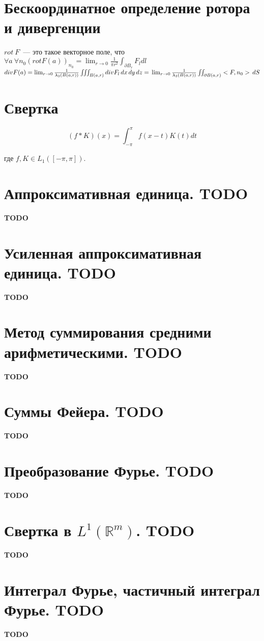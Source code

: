 \documentclass[paper=a4, fontsize=17pt]{article}
\begin{document}
	\section{Бескоординатное определение ротора и дивергенции}
	$rot\ F$~--- это такое векторное поле, что $\forall a \ \forall n_0 (rot F(a))_{n_0} = \lim_{r\to 0} \frac{1}{\pi r^2} \int_{\partial B_r} F_ldl$
\\

	$div F(a) = \lim_{r\to 0} \frac{1}{\lambda_3(B(a,r))} \iiint_{B(a,r)} div F_l \,dx\,dy\,dz = \\ \lim_{r\to 0} \frac{1}{\lambda_3(B(a,r))} \iint_{\partial B(a,r)} <F, n_0>\,dS$

	\section{Свертка}

	$$ (f \ast K)(x) = \int_{-\pi}^{\pi} f(x-t)K(t) dt$$

	где $ f, K \in L_1([-\pi, \pi])$.

\section{Аппроксимативная единица. TODO}
	{\color{red} \textbf{TODO}}
\section{Усиленная аппроксимативная единица. TODO}
	{\color{red} \textbf{TODO}}
\section{Метод суммирования средними арифметическими. TODO}
	{\color{red} \textbf{TODO}}
\section{Суммы Фейера. TODO}
	{\color{red} \textbf{TODO}}
\section{Преобразование Фурье. TODO}
	{\color{red} \textbf{TODO}}
\section{Свертка в $L^1(\mathds{R}^m)$. TODO}
	{\color{red} \textbf{TODO}}
\section{Интеграл Фурье, частичный интеграл Фурье. TODO}
	{\color{red} \textbf{TODO}}
\end{document}
